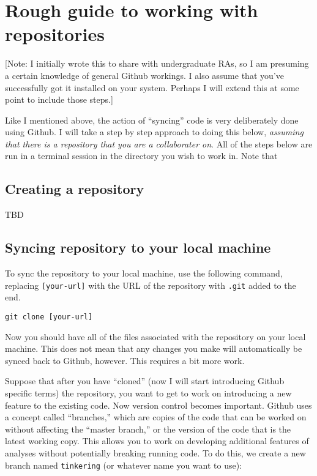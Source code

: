 \documentclass[11pt, oneside]{article}   	%
\begin{document}
\section{Rough guide to working with repositories}
[Note: I initially wrote this to share with undergraduate RAs, so I am presuming a certain knowledge of general Github workings. I also assume that you've successfully got it installed on your system. Perhaps I will extend this at some point to include those steps.]

Like I mentioned above, the action of ``syncing'' code is very deliberately done using Github. I will take a step by step approach to doing this below, \textit{assuming that there is a repository that you are a collaborater on}. All of the steps below are run in a terminal session in the directory you wish to work in. Note that 

\subsection{Creating a repository}
TBD

\subsection{Syncing repository to your local machine }

To sync the repository to your local machine, use the following command, replacing \texttt{[your-url]} with the URL of the repository with \texttt{.git} added to the end. 

\begin{lstlisting}
git clone [your-url]
\end{lstlisting}

\noindent Now you should have all of the files associated with the repository on your local machine. This does not mean that any changes you make will automatically be synced back to Github, however. This requires a bit more work.

Suppose that after you have ``cloned'' (now I will start introducing Github specific terms) the repository, you want to get to work on introducing a new feature to the existing code. Now version control becomes important. Github uses a concept called ``branches,'' which are copies of the code that can be worked on without affecting the ``master branch,'' or the version of the code that is the latest working copy. This allows you to work on developing additional features of analyses without potentially breaking running code. To do this, we create a new branch named \texttt{tinkering} (or whatever name you want to use):
\end{document}
